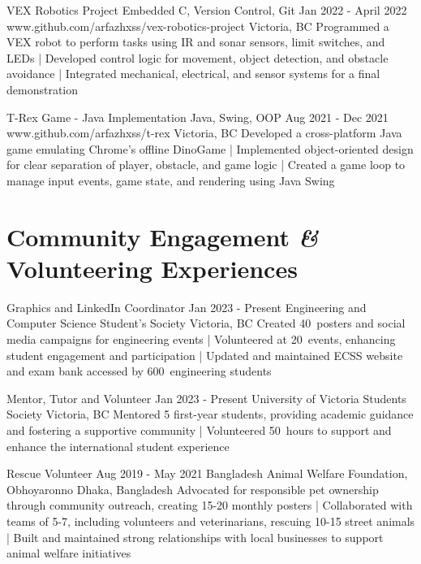 \documentclass[a4paper,10pt]{article}
\begin{document}
\projectentry
{VEX Robotics Project}
{Embedded C, Version Control, Git}
{Jan 2022 - April 2022}
{www.github.com/arfazhxss/vex-robotics-project}
{Victoria, BC}
{Programmed a VEX robot to perform tasks using IR and sonar sensors, limit switches, and LEDs 
| Developed control logic for movement, object detection, and obstacle avoidance 
| Integrated mechanical, electrical, and sensor systems for a final demonstration 
}

\projectentry
{T-Rex Game - Java Implementation}
{Java, Swing, OOP}
{Aug 2021 - Dec 2021}
{www.github.com/arfazhxss/t-rex}
{Victoria, BC}
{Developed a cross-platform Java game emulating Chrome’s offline DinoGame 
| Implemented object-oriented design for clear separation of player, obstacle, and game logic 
| Created a game loop to manage input events, game state, and rendering using Java Swing 
}

\section{Community Engagement \textit{\&} Volunteering Experiences}

\volunteeringexperiences
{Graphics and LinkedIn Coordinator}
{Jan 2023 - Present}
{Engineering and Computer Science Student’s Society}
{Victoria, BC}
{Created 40\plus\ posters and social media campaigns for engineering events 
| Volunteered at 20\plus\ events, enhancing student engagement and participation 
| Updated and maintained ECSS website and exam bank accessed by 600\plus\ engineering students
}

\volunteeringexperiences
{Mentor, Tutor and Volunteer}
{Jan 2023 - Present}
{University of Victoria Students Society}
{Victoria, BC}
{Mentored 5 first-year students, providing academic guidance and fostering a supportive community
| Volunteered 50\plus\ hours to support and enhance the international student experience 
}

\volunteeringexperiences
{Rescue Volunteer}
{Aug 2019 - May 2021}
{Bangladesh Animal Welfare Foundation, Obhoyaronno}
{Dhaka, Bangladesh}
{Advocated for responsible pet ownership through community outreach, creating 15-20 monthly posters 
| Collaborated with teams of 5-7, including volunteers and veterinarians, rescuing 10-15 street animals 
| Built and maintained strong relationships with local businesses to support animal welfare initiatives
}

%
\end{document}
